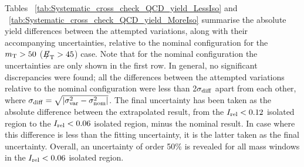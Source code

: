 
Tables ~\ref{tab:Systematic_cross_check_QCD_yield_LessIso} and  ~\ref{tab:Systematic_cross_check_QCD_yield_MoreIso} summarise the absolute yield differences between the attempted variations, along with their accompanying uncertainties,  relative to the nominal configuration for the  $m_{\mathrm{\rm T}}>50$ (${E\!\!\!/}_{\mathrm{T}}>45$) case. Note that for the nominal configuration the uncertainties are only shown in the first row. In general, no significant discrepancies were found; all the differences between the attempted variations relative to the nominal configuration were less than 2$\sigma_{\rm{diff}}$ apart from each other, where $\sigma_{\rm{diff}}=\sqrt{| \sigma_{\rm{var}}^{2} - \sigma_{\rm{nom}}^{2} | }$. The final uncertainty has been taken as the absolute difference between the extrapolated result, from the $I_{\mathrm{rel}} < 0.12$ isolated region to the $I_{\mathrm{rel}} < 0.06$ isolated region, minus the nominal result. In case where this difference is less than the fitting uncertainty, it is the latter taken as the final uncertainty. Overall, an uncertainty of order 50$\%$ is revealed for all mass windows in the $I_{\mathrm{rel}} < 0.06$ isolated region.

